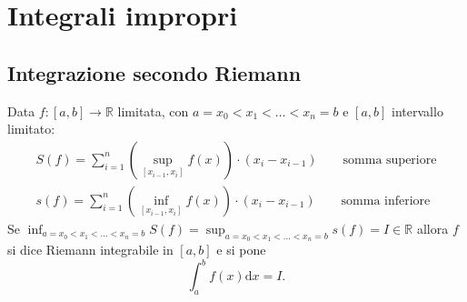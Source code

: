 \chapter{Integrali impropri}
\section{Integrazione secondo Riemann}

Data $f:[a,b] \rightarrow \mathbb{R}$ limitata, con $a=x_0 < x_1 < \ldots < x_n =b$ e $[a,b]$ intervallo limitato:
\begin{gather*}
	S(f) =\sum_{i=1}^{n} \left( \sup_{[x_{i-1},x_i]} f(x) \right) \cdot (x_i-x_{i-1}) \qquad \text{somma superiore}
	\\
	s(f) =\sum_{i=1}^{n} \left(\inf_{[x_{i-1},x_i]} f(x)\right)\cdot (x_i-x_{i-1}) \qquad \text{somma inferiore}
\end{gather*}
Se $\inf_{a=x_0 < x_1 < ... < x_n =b} S(f) = \sup_{a=x_0 < x_1 < ... < x_n =b} s(f) =I \in \mathbb{R}$ allora $f$ si dice Riemann integrabile in $[a,b]$ e si pone 
\begin{equation*}
	\int_{a}^{b} f(x) \mathrm{d}x=I.
\end{equation*}


